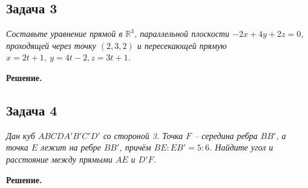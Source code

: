 	\subsection{Задача 3} 
	\textit{Составьте уравнение прямой в $\mathbb{R}^3$, параллельной плоскости $-2x+4y+2z=0$, проходящей через точку $(2,3,2)$ и пересекающей прямую $x = 2t + 1,\ y = 4t - 2, z = 3t + 1$.}
	
	\textbf{Решение.}\\
	
	\subsection{Задача 4} 
	\textit{Дан куб $ABCDA'B'C'D'$ со стороной 3. Точка $F$ -- середина ребра $BB'$, а точка $E$ лежит на ребре $BB'$, причём $BE : EB' = 5 : 6$. Найдите угол и расстояние между прямыми $AE$ и $D'F$.}
	
	\textbf{Решение.}\\

	